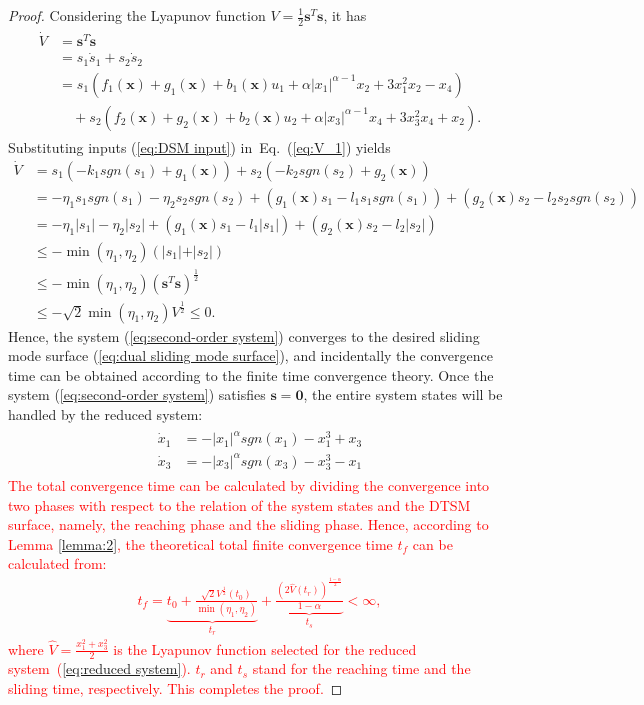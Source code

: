 \documentclass[3p]{elsarticle}
\theoremstyle{plain}
\theoremstyle{remark}
\begin{document}
\begin{proof}
Considering the Lyapunov function $V=\frac{1}{2}{\bm s}^T\bm s$, it has
\begin{align}
\begin{split}
\dot V &= {\bm s}^T\dot{\bm  s}\\
&=s_1\dot s_1+s_2\dot s_2\\
&=s_1(f_1(\bm x)+g_1(\bm x)+b_1(\bm x)u_1+\alpha\vert x_1\vert^{\alpha-1}x_2+3x_1^2x_2-x_4)\\
&\quad +s_2(f_2(\bm x)+g_2(\bm x)+b_2(\bm x)u_2+\alpha\vert x_3\vert^{\alpha-1}x_4+3x_3^2x_4+x_2).\label{eq:V_1}
\end{split}
\end{align}
Substituting inputs (\ref{eq:DSM input}) in~Eq.~(\ref{eq:V_1}) yields
\begin{align*}
\dot V &= s_1(-k_1sgn(s_1)+g_1(\bm x))+s_2(-k_2sgn(s_2)+g_2(\bm x))\\
&= -\eta_1s_1sgn(s_1)-\eta_2s_2sgn(s_2)+(g_1(\bm x)s_1 - l_1s_1sgn(s_1))+(g_2(\bm x)s_2 - l_2s_2sgn(s_2))\\
&= -\eta_1\vert s_1\vert-\eta_2\vert s_2\vert+(g_1(\bm x)s_1 - l_1\vert s_1\vert)+(g_2(\bm x)s_2 - l_2\vert s_2\vert)\\
&\le - \min(\eta_1,\eta_2)(\vert s_1\vert+\vert s_2\vert)\\
&\le -\min(\eta_1,\eta_2)({\bm s}^T\bm s)^\frac{1}{2}\\
&\le -\sqrt{2}\min(\eta_1,\eta_2)V^\frac{1}{2}\le 0.
\end{align*}
Hence, the system (\ref{eq:second-order system}) converges to the desired sliding mode  surface (\ref{eq:dual sliding mode  surface}), and incidentally the convergence time can be obtained according to the finite time convergence theory. Once the system (\ref{eq:second-order system}) satisfies $\bm s = \bm 0$, the entire system states will be handled by the reduced system:
\begin{align}
  \begin{split}
\dot x_1&=-\vert x_1\vert^\alpha sgn(x_1)-x_1^3+x_3\\
\dot x_3&=-\vert x_3\vert^\alpha sgn(x_3)-x_3^3-x_1\label{eq:reduced system}
\end{split}
\end{align}
\textcolor{red}{The total convergence time can be calculated by dividing the convergence into two phases with respect to the relation of the system states and the DTSM surface, namely, the reaching phase and the sliding phase. Hence, according to Lemma \ref{lemma:2}, the theoretical total finite convergence time $t_f$ can be calculated from:
\begin{align}
t_f = \underbrace{t_0+\frac{\sqrt{2}V^{\frac{1}{2}}(t_0)}{\min(\eta_1,\eta_2)}}_{t_r}+\underbrace{\frac{(2\hat V(t_r))^{\frac{1-\alpha}{2}}}{1-\alpha}}_{t_s}<\infty,
\end{align}
where $\hat V = \frac{x_1^2+x_3^2}{2}$ is the Lyapunov function selected for the reduced system~(\ref{eq:reduced system}). $t_r$ and $t_s$ stand for the reaching time and the sliding time, respectively. This completes the proof.}
\end{proof}
\end{document}
